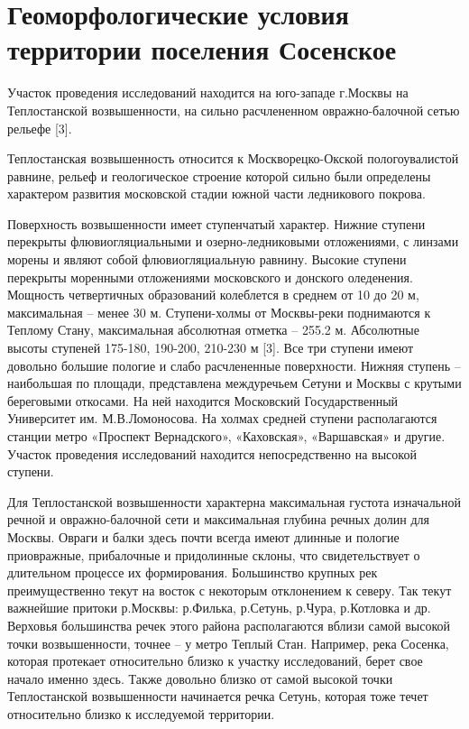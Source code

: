 \chapter{Геоморфологические условия территории поселения Сосенское}\label{ch:ch3}

Участок проведения исследований находится на юго-западе г.Москвы на Теплостанской возвышенности, на сильно расчлененном овражно-балочной сетью рельефе [3]. 

Теплостанская возвышенность относится к Москворецко-Окской пологоувалистой равнине, рельеф 
и геологическое строение которой сильно были определены характером развития московской стадии южной части ледникового покрова. 

Поверхность возвышенности имеет ступенчатый характер. Нижние ступени перекрыты флювиогляциальными 
и озерно-ледниковыми отложениями, с линзами морены и являют собой флювиогляциальную равнину. 
Высокие ступени перекрыты моренными отложениями московского и донского оледенения. 
Мощность четвертичных образований колеблется в среднем от 10 до 20 м, максимальная – менее 30 м. 
Ступени-холмы от Москвы-реки поднимаются к Теплому Стану, максимальная абсолютная отметка – 255.2 м. 
Абсолютные высоты ступеней 175-180, 190-200, 210-230 м [3]. Все три ступени имеют довольно большие пологие 
и слабо расчлененные поверхности. Нижняя ступень – наибольшая по площади, представлена междуречьем Сетуни 
и Москвы с крутыми береговыми откосами. На ней находится Московский Государственный Университет им. М.В.Ломоносова. 
На холмах средней ступени располагаются станции метро «Проспект Вернадского», «Каховская», «Варшавская» и другие. 
Участок проведения исследований находится непосредственно на высокой ступени. 

Для Теплостанской возвышенности характерна максимальная густота изначальной речной 
и овражно-балочной сети и максимальная глубина речных долин для Москвы. 
Овраги и балки здесь почти всегда имеют длинные и пологие приовражные, прибалочные и придолинные склоны, 
что свидетельствует о длительном процессе их формирования. Большинство крупных рек преимущественно текут 
на восток с некоторым отклонением к северу. Так текут важнейшие притоки р.Москвы: 
р.Филька, р.Сетунь, р.Чура, р.Котловка и др. 
Верховья большинства речек этого района располагаются вблизи самой высокой точки возвышенности, 
точнее – у метро Теплый Стан. Например, река Сосенка, которая протекает относительно близко к участку исследований, 
берет свое начало именно здесь. Также довольно близко от самой высокой точки 
Теплостанской возвышенности начинается речка Сетунь, которая тоже течет относительно близко к исследуемой территории.